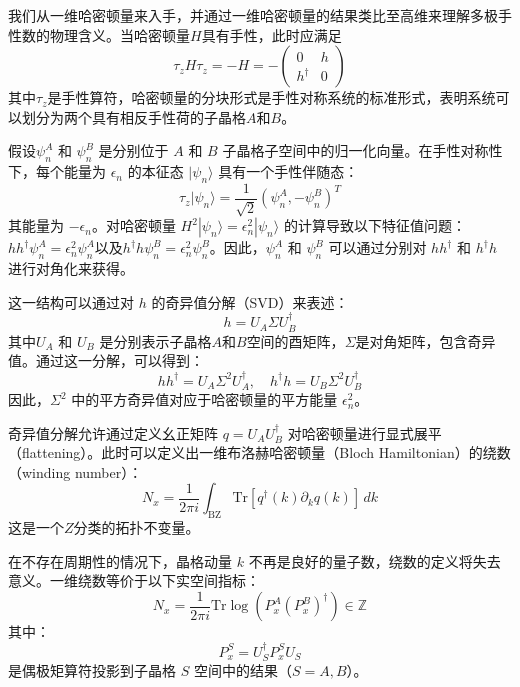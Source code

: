 我们从一维哈密顿量来入手，并通过一维哈密顿量的结果类比至高维来理解多极手性数的物理含义。当哈密顿量$H$具有手性，此时应满足
\begin{equation}
\tau_z H \tau_z = -H = -
\begin{pmatrix}
0 & h \\
h^\dagger & 0
\end{pmatrix}
\end{equation}
其中$\tau_z$是手性算符，哈密顿量的分块形式是手性对称系统的标准形式，表明系统可以划分为两个具有相反手性荷的子晶格$A$和$B$。

假设\(\psi_n^A\) 和 \(\psi_n^B\) 是分别位于 \( A \) 和 \( B \) 子晶格子空间中的归一化向量。在手性对称性下，每个能量为 \( \epsilon_n \) 的本征态 \( |\psi_n\rangle \) 具有一个手性伴随态：
\begin{equation}
\tau_z |\psi_n\rangle = \frac{1}{\sqrt{2}} (\psi_n^A, -\psi_n^B)^T
\end{equation}
其能量为 \( -\epsilon_n \)。对哈密顿量 \( H^2 |\psi_n\rangle = \epsilon_n^2 |\psi_n\rangle \) 的计算导致以下特征值问题：$h h^\dagger \psi_n^A = \epsilon_n^2 \psi_n^A$以及$h^\dagger h \psi_n^B = \epsilon_n^2 \psi_n^B$。因此，\(\psi_n^A\) 和 \(\psi_n^B\) 可以通过分别对 \( h h^\dagger \) 和 \( h^\dagger h \) 进行对角化来获得。

这一结构可以通过对 \( h \) 的奇异值分解（SVD）来表述：
\begin{equation}
h = U_A \Sigma U_B^\dagger
\end{equation}
其中$U_A$ 和 $U_B$ 是分别表示子晶格$A$和$B$空间的酉矩阵，$\Sigma$是对角矩阵，包含奇异值。通过这一分解，可以得到：
\begin{equation}
h h^\dagger = U_A \Sigma^2 U_A^\dagger, \quad h^\dagger h = U_B \Sigma^2 U_B^\dagger
\end{equation}
因此，\(\Sigma^2\) 中的平方奇异值对应于哈密顿量的平方能量 \( \epsilon_n^2 \)。

奇异值分解允许通过定义幺正矩阵 \( q= U_A U_B^\dagger \) 对哈密顿量进行显式展平（flattening）。此时可以定义出一维布洛赫哈密顿量（Bloch Hamiltonian）的绕数（winding number）：
\begin{equation}
N_x = \frac{1}{2\pi i} \int_{\text{BZ}} \mathrm{Tr} \left[ q^\dagger(k) \partial_k q(k) \right] \, dk
\end{equation}
这是一个$Z$分类的拓扑不变量。

在不存在周期性的情况下，晶格动量 \( k \) 不再是良好的量子数，绕数的定义将失去意义。一维绕数等价于以下实空间指标：
\begin{equation}
N_x = \frac{1}{2\pi i} \mathrm{Tr} \log \left( P_x^A (P_x^B)^\dagger \right) \in \mathbb{Z}
\end{equation}
其中：
\begin{equation}
P_x^S = U_S^\dagger P_x^S U_S
\end{equation}
是偶极矩算符投影到子晶格 \( S \) 空间中的结果（\( S = A, B \)）。

